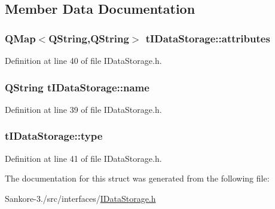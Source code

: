 \subsection{Member Data Documentation}
\hypertarget{structt_i_data_storage_a1414513a860cd82fbf60007ddbd0d5b2}{
\subsubsection[{attributes}]{\setlength{\rightskip}{0pt plus 5cm}Q\-Map$<$Q\-String,Q\-String$>$ t\-I\-Data\-Storage\-::attributes}}\label{d9/d07/structt_i_data_storage_a1414513a860cd82fbf60007ddbd0d5b2}


Definition at line 40 of file I\-Data\-Storage.\-h.

\hypertarget{structt_i_data_storage_a35e24f4bca7e31200c17e310b1ad1ad2}{
\subsubsection[{name}]{\setlength{\rightskip}{0pt plus 5cm}Q\-String t\-I\-Data\-Storage\-::name}}\label{d9/d07/structt_i_data_storage_a35e24f4bca7e31200c17e310b1ad1ad2}


Definition at line 39 of file I\-Data\-Storage.\-h.

\hypertarget{structt_i_data_storage_a9eb9d9fc94c3d3f945f11ca952006090}{
\subsubsection[{type}]{ t\-I\-Data\-Storage\-::type}}\label{d9/d07/structt_i_data_storage_a9eb9d9fc94c3d3f945f11ca952006090}


Definition at line 41 of file I\-Data\-Storage.\-h.



The documentation for this struct was generated from the following file\-:\begin{DoxyCompactItemize}
\item 
Sankore-\/3./src/interfaces/\hyperlink{_i_data_storage_8h}{I\-Data\-Storage.\-h}\end{DoxyCompactItemize}
